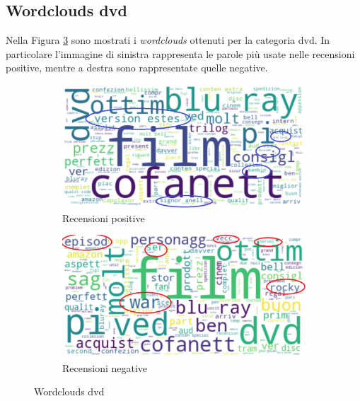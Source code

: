 		
		\subsection{Wordclouds dvd}
			Nella Figura \ref{fig:wordclouds_dvd} sono mostrati i \textit{wordclouds} ottenuti per la categoria dvd. In particolare l'immagine di sinistra rappresenta le parole più usate nelle recensioni positive, mentre a destra sono rappresentate quelle negative. 
				
			\begin{figure} [h]
				\centering
				\begin{subfigure}{0.48\textwidth}
					\includegraphics[width=\textwidth]{Figure/top_positive_dvd}
					\caption{Recensioni positive}
					\label{fig:top_positive_dvd}
				\end{subfigure}
				\begin{subfigure}{0.48\textwidth}
					\includegraphics[width=\textwidth]{Figure/top_negative_dvd}
					\caption{Recensioni negative}
					\label{fig:top_negative_dvd}
				\end{subfigure}
				\caption{Wordclouds dvd}\label{fig:wordclouds_dvd}
			\end{figure}
		

